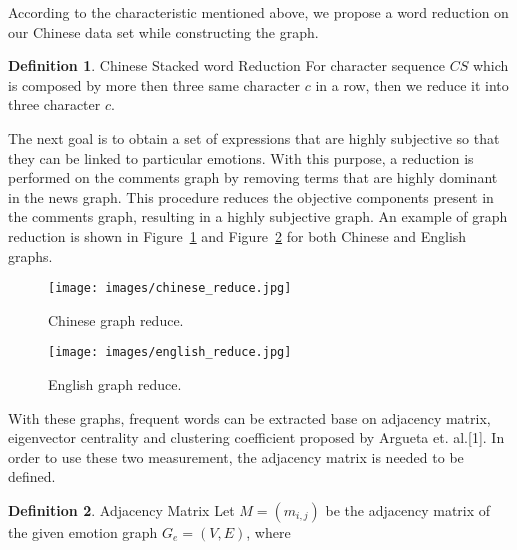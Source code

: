 \documentclass[12pt,a4paper]{report}
\theoremstyle{definition}
\newtheorem{definition}{Definition}[chapter]
\begin{document}
\begin{CJK}{UTF8}{bsmi}
\begin{CJK}{UTF8}{bsmi}
\begin{CJK}{UTF8}{bsmi}
\begin{table}[H]
    \end{table}
    \end{CJK}
    According to the characteristic mentioned above, we propose a word reduction on our Chinese data set while constructing the graph.
    \end{CJK}
    \begin{definition}{Chinese Stacked word Reduction}
    \newline
    For character sequence \(CS\) which is composed by more then three same character \(c\) in a row, then we reduce it into three character \(c\).
    \end{definition}
    \par The next goal is to obtain a set of expressions that are highly subjective so that they can be linked to particular emotions. With this purpose, a reduction is performed on the comments graph by removing terms that are highly dominant in the news graph. This procedure reduces the objective components present in the comments graph, resulting in a highly subjective graph. An example of graph reduction is shown in Figure~\ref{fig:chinese_graph_reduction} and Figure~\ref{fig:english_graph_reduction} for both Chinese and English graphs.
    \begin{figure}[H]
        \centering
        \texttt{[image: images/chinese\_reduce.jpg]}
        \caption{Chinese graph reduce.}
        \label{fig:chinese_graph_reduction}
    \end{figure}
    \begin{figure}[H]
        \centering
        \texttt{[image: images/english\_reduce.jpg]}
        \caption{English graph reduce.}
        \label{fig:english_graph_reduction}
    \end{figure}
    \par With these graphs, frequent words can be extracted base on adjacency matrix, eigenvector centrality and clustering coefficient proposed by Argueta et. al.[1].
    In order to use these two measurement, the adjacency matrix is needed to be defined.
    \theoremstyle{definition}
    \begin{definition}{Adjacency Matrix}
    \newline
    Let \(M = (m_{i,j})\) be the adjacency matrix of the given emotion graph \(G_e = (V,E)\), where
    \newline

\end{definition}
\end{CJK}
\end{document}
